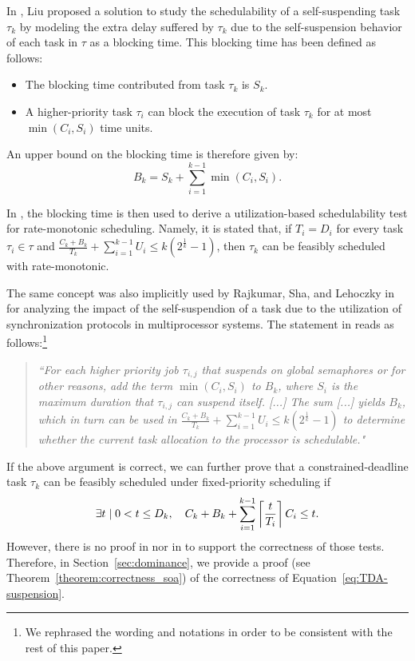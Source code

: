 In \cite[p. 164-165]{Liu:2000:RS:518501}, Liu proposed a solution to study the schedulability of a self-suspending task $\tau_k$ by modeling the extra delay suffered by $\tau_k$ due to the self-suspension behavior of each task in $\tau$ as a blocking time. This blocking time has been defined as follows:
\begin{itemize}
\item The blocking time contributed from task $\tau_k$ is $S_k$. 
\item A higher-priority task $\tau_i$ can block the execution of task $\tau_k$ for at most $\min(C_i, S_i)$ time units.
\end{itemize}
An upper bound on the blocking time is therefore given by:
\begin{equation}
\label{eq:Bk}
B_k = S_k + \sum_{i=1}^{k-1} \min(C_i, S_i).
\end{equation}

In \cite{Liu:2000:RS:518501}, the blocking time is then used to derive a utilization-based schedulability test for rate-monotonic scheduling. Namely, it is stated that, if $T_i=D_i$ for every task $\tau_i \in \tau$ and $\frac{C_k+B_k}{T_k} + \sum_{i=1}^{k-1} U_i \leq k (2^{\frac{1}{k}}-1)$, then $\tau_k$ can be feasibly scheduled with rate-monotonic. 
  

The same concept was also implicitly used by Rajkumar, Sha, and Lehoczky in~\cite[p. 267]{DBLP:conf/rtss/RajkumarSL88} for analyzing the impact of the self-suspendion of a task due to the utilization of synchronization protocols in multiprocessor systems. The statement in \cite{DBLP:conf/rtss/RajkumarSL88} reads as follows:\footnote{We rephrased the wording and notations in order to be consistent with the rest of this paper.}
\begin{quote}
\emph{``For each higher priority job $\tau_{i,j}$ that suspends on global semaphores or for other reasons, add the term $\min(C_i, S_i)$ to $B_k$, where $S_i$ is the maximum duration that $\tau_{i,j}$ can suspend itself. [...] The sum [...] yields $B_k$, which in turn can be used in 
$\frac{C_k+B_k}{T_k} + \sum_{i=1}^{k-1} U_i \leq k (2^{\frac{1}{k}}-1)$ to determine whether the current task allocation to the processor is schedulable."}
\end{quote}
  
If the above argument is correct, we can further prove that a constrained-deadline task $\tau_k$ can be feasibly scheduled under fixed-priority scheduling if
\begin{equation}
\label{eq:TDA-suspension}
\exists t \mid 0 < t \leq D_k, \quad C_k + B_k + \sum_{i=1}^{k-1}\ceiling{\frac{t}{T_i}} C_i \leq t.
\end{equation}
However, there is no proof in
\cite{Liu:2000:RS:518501} nor in \cite{DBLP:conf/rtss/RajkumarSL88} to support the correctness of those tests. Therefore, in Section~\ref{sec:dominance}, we provide a proof (see Theorem~\ref{theorem:correctness_soa}) of the correctness of Equation~\eqref{eq:TDA-suspension}.

